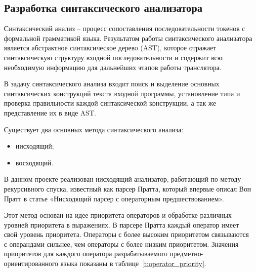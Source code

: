 \subsection{Разработка синтаксического анализатора}


Синтаксический анализ – процесс сопоставления последовательности токенов с формальной грамматикой языка.
Результатом работы синтаксического анализатора является абстрактное синтаксическое дерево (AST),
которое отражает синтаксическую структуру входной последовательности и содержит всю необходимую информацию для дальнейших этапов работы транслятора.

В задачу синтаксического анализа входит поиск и выделение основных синтаксических конструкций текста входной программы,
установление типа и проверка правильности каждой синтаксической конструкции, а так же представление их в виде AST.

Существует два основных метода синтаксического анализа:

\begin{itemize}
    \item нисходящий;
    \item восходящий.
\end{itemize}

В данном проекте реализован нисходящий анализатор, работающий по методу рекурсивного спуска,
известный как парсер Пратта, который впервые описал Вон Пратт в статье «Нисходящий парсер с операторным предшествованием».

Этот метод основан на идее приоритета операторов и обработке различных уровней приоритета в выражениях.
В парсере Пратта каждый оператор имеет свой уровень приоритета.
Операторы с более высоким приоритетом связываются с операндами сильнее, чем операторы с более низким приоритетом.
Значения приоритетов для каждого оператора разрабатываемого предметно-ориентированного языка показаны в таблице~\ref{t:operator_priority}.

\clearpage

